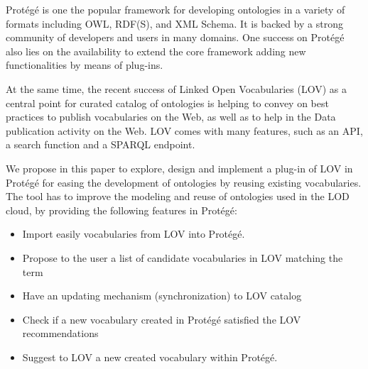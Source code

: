 Prot{\'e}g{\'e} is one the popular framework for developing ontologies in a variety of formats including OWL, RDF(S), and XML Schema. It is backed by a strong community of developers and users in many domains. One success on Prot{\'e}g{\'e} also lies on the availability to extend the core framework adding new functionalities by means of plug-ins.

At the same time, the recent success of Linked Open Vocabularies (LOV) as a central point for curated catalog of ontologies is helping to convey on best practices to publish vocabularies on the Web, as well as to help in the Data publication activity on the Web. LOV comes with many features, such as an API, a search function and a SPARQL endpoint.
 
We propose in this paper to explore, design and implement a plug-in of LOV in Prot{\'e}g{\'e} for easing the development of ontologies by reusing existing vocabularies. 
The tool has to improve the modeling and reuse of ontologies used in the LOD cloud, by providing the following features in Prot{\'e}g{\'e}:

\begin{itemize}
\item Import easily vocabularies from LOV into Prot{\'e}g{\'e}. 
\item Propose to the user a list of candidate vocabularies in LOV matching the term
\item Have an updating mechanism (synchronization) to LOV catalog
\item Check if a new vocabulary created in Prot{\'e}g{\'e} satisfied the LOV recommendations

\item Suggest to LOV a new created vocabulary within Prot{\'e}g{\'e}.
\end{itemize}


